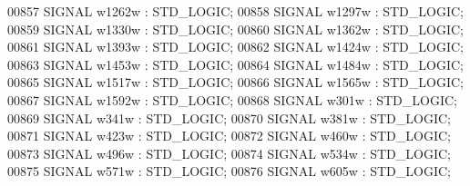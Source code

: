 \begin{DoxyCode}
{00857      \textcolor{keywordflow}{SIGNAL}  \textcolor{vhdlchar}{w1262w} \textcolor{vhdlchar}{:}   \textcolor{comment}{STD\_LOGIC};
00858      \textcolor{keywordflow}{SIGNAL}  \textcolor{vhdlchar}{w1297w} \textcolor{vhdlchar}{:}   \textcolor{comment}{STD\_LOGIC};
00859      \textcolor{keywordflow}{SIGNAL}  \textcolor{vhdlchar}{w1330w} \textcolor{vhdlchar}{:}   \textcolor{comment}{STD\_LOGIC};
00860      \textcolor{keywordflow}{SIGNAL}  \textcolor{vhdlchar}{w1362w} \textcolor{vhdlchar}{:}   \textcolor{comment}{STD\_LOGIC};
00861      \textcolor{keywordflow}{SIGNAL}  \textcolor{vhdlchar}{w1393w} \textcolor{vhdlchar}{:}   \textcolor{comment}{STD\_LOGIC};
00862      \textcolor{keywordflow}{SIGNAL}  \textcolor{vhdlchar}{w1424w} \textcolor{vhdlchar}{:}   \textcolor{comment}{STD\_LOGIC};
00863      \textcolor{keywordflow}{SIGNAL}  \textcolor{vhdlchar}{w1453w} \textcolor{vhdlchar}{:}   \textcolor{comment}{STD\_LOGIC};
00864      \textcolor{keywordflow}{SIGNAL}  \textcolor{vhdlchar}{w1484w} \textcolor{vhdlchar}{:}   \textcolor{comment}{STD\_LOGIC};
00865      \textcolor{keywordflow}{SIGNAL}  \textcolor{vhdlchar}{w1517w} \textcolor{vhdlchar}{:}   \textcolor{comment}{STD\_LOGIC};
00866      \textcolor{keywordflow}{SIGNAL}  \textcolor{vhdlchar}{w1565w} \textcolor{vhdlchar}{:}   \textcolor{comment}{STD\_LOGIC};
00867      \textcolor{keywordflow}{SIGNAL}  \textcolor{vhdlchar}{w1592w} \textcolor{vhdlchar}{:}   \textcolor{comment}{STD\_LOGIC};
00868      \textcolor{keywordflow}{SIGNAL}  \textcolor{vhdlchar}{w301w} \textcolor{vhdlchar}{:}    \textcolor{comment}{STD\_LOGIC};
00869      \textcolor{keywordflow}{SIGNAL}  \textcolor{vhdlchar}{w341w} \textcolor{vhdlchar}{:}    \textcolor{comment}{STD\_LOGIC};
00870      \textcolor{keywordflow}{SIGNAL}  \textcolor{vhdlchar}{w381w} \textcolor{vhdlchar}{:}    \textcolor{comment}{STD\_LOGIC};
00871      \textcolor{keywordflow}{SIGNAL}  \textcolor{vhdlchar}{w423w} \textcolor{vhdlchar}{:}    \textcolor{comment}{STD\_LOGIC};
00872      \textcolor{keywordflow}{SIGNAL}  \textcolor{vhdlchar}{w460w} \textcolor{vhdlchar}{:}    \textcolor{comment}{STD\_LOGIC};
00873      \textcolor{keywordflow}{SIGNAL}  \textcolor{vhdlchar}{w496w} \textcolor{vhdlchar}{:}    \textcolor{comment}{STD\_LOGIC};
00874      \textcolor{keywordflow}{SIGNAL}  \textcolor{vhdlchar}{w534w} \textcolor{vhdlchar}{:}    \textcolor{comment}{STD\_LOGIC};
00875      \textcolor{keywordflow}{SIGNAL}  \textcolor{vhdlchar}{w571w} \textcolor{vhdlchar}{:}    \textcolor{comment}{STD\_LOGIC};
00876      \textcolor{keywordflow}{SIGNAL}  \textcolor{vhdlchar}{w605w} \textcolor{vhdlchar}{:}    \textcolor{comment}{STD\_LOGIC};
}
\end{DoxyCode}
